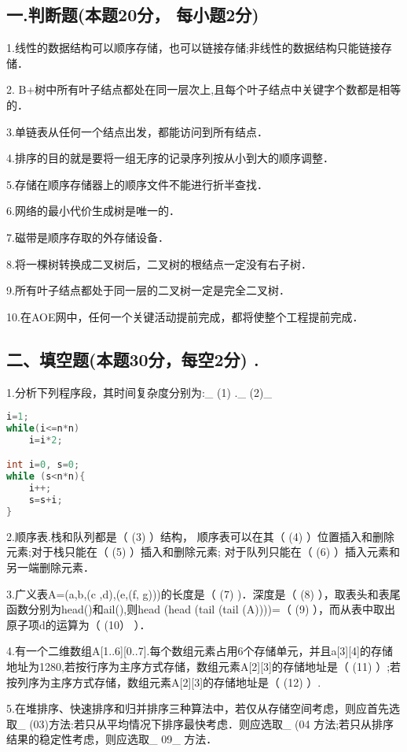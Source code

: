 
\subsection{一.判断题(本题20分， 每小题2分)}

1.线性的数据结构可以顺序存储，也可以链接存储;非线性的数据结构只能链接存储．

2. B+树中所有叶子结点都处在同一层次上,且每个叶子结点中关键字个数都是相等的．

3.单链表从任何一个结点出发，都能访问到所有结点．

4.排序的目的就是要将一组无序的记录序列按从小到大的顺序调整．

5.存储在顺序存储器上的顺序文件不能进行折半查找．

6.网络的最小代价生成树是唯一的．

7.磁带是顺序存取的外存储设备．

8.将一棵树转换成二叉树后，二叉树的根结点一定没有右子树．

9.所有叶子结点都处于同一层的二叉树一定是完全二叉树．

10.在AOE网中，任何一个关键活动提前完成，都将使整个工程提前完成．

\subsection{二、填空题(本题30分，每空2分) .}

1.分析下列程序段，其时间复杂度分别为:_ (1) ._ (2)_
\begin{lstlisting}[language=cpp]
i=1;
while(i<=n*n)
    i=i*2;

int i=0, s=0;
while (s<n*n){
    i++;
    s=s+i;
}
\end{lstlisting}

2.顺序表.栈和队列都是（ (3) ）结构， 顺序表可以在其（ (4) ）位置插入和删除元素;对于栈只能在（ (5) ）插入和删除元素; 对于队列只能在（ (6) ）插入元素和另一端删除元素．

3.广义表A=(a,b,(c ,d),(e,(f, g)))的长度是（ (7) )．深度是（ (8) ），取表头和表尾函数分别为head()和ail(),则head (head (tail (tail (A))))=（ (9) ），而从表中取出原子项d的运算为（ (10） ）．

4.有一个二维数组A[1..6][0..7].每个数组元素占用6个存储单元，并且a[3][4]的存储地址为1280,若按行序为主序方式存储，数组元素A[2][3]的存储地址是（ (11) ）;若按列序为主序方式存储，数组元素A[2][3]的存储地址是（ (12) ）.

5.在堆排序、快速排序和归并排序三种算法中，若仅从存储空间考虑，则应首先选取_ (03)方法:若只从平均情况下排序最快考虑．则应选取_ (04 方法;若只从排序结果的稳定性考虑，则应选取_ 09_ 方法．
